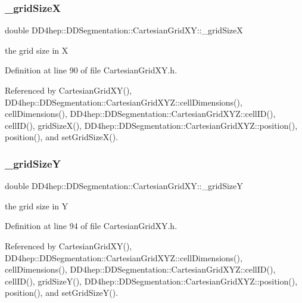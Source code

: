 \subsubsection{\texorpdfstring{\+\_\+grid\+SizeX}{\_gridSizeX}}
{\footnotesize\ttfamily double D\+D4hep\+::\+D\+D\+Segmentation\+::\+Cartesian\+Grid\+X\+Y\+::\+\_\+grid\+SizeX\hspace{0.3cm}{\ttfamily [protected]}}



the grid size in X 



Definition at line 90 of file Cartesian\+Grid\+X\+Y.\+h.



Referenced by Cartesian\+Grid\+X\+Y(), D\+D4hep\+::\+D\+D\+Segmentation\+::\+Cartesian\+Grid\+X\+Y\+Z\+::cell\+Dimensions(), cell\+Dimensions(), D\+D4hep\+::\+D\+D\+Segmentation\+::\+Cartesian\+Grid\+X\+Y\+Z\+::cell\+I\+D(), cell\+I\+D(), grid\+Size\+X(), D\+D4hep\+::\+D\+D\+Segmentation\+::\+Cartesian\+Grid\+X\+Y\+Z\+::position(), position(), and set\+Grid\+Size\+X().

\hypertarget{class_d_d4hep_1_1_d_d_segmentation_1_1_cartesian_grid_x_y_a63a6d16599e635a2046e144fb465e181}{}\label{class_d_d4hep_1_1_d_d_segmentation_1_1_cartesian_grid_x_y_a63a6d16599e635a2046e144fb465e181} 
\subsubsection{\texorpdfstring{\+\_\+grid\+SizeY}{\_gridSizeY}}
{\footnotesize\ttfamily double D\+D4hep\+::\+D\+D\+Segmentation\+::\+Cartesian\+Grid\+X\+Y\+::\+\_\+grid\+SizeY\hspace{0.3cm}{\ttfamily [protected]}}



the grid size in Y 



Definition at line 94 of file Cartesian\+Grid\+X\+Y.\+h.



Referenced by Cartesian\+Grid\+X\+Y(), D\+D4hep\+::\+D\+D\+Segmentation\+::\+Cartesian\+Grid\+X\+Y\+Z\+::cell\+Dimensions(), cell\+Dimensions(), D\+D4hep\+::\+D\+D\+Segmentation\+::\+Cartesian\+Grid\+X\+Y\+Z\+::cell\+I\+D(), cell\+I\+D(), grid\+Size\+Y(), D\+D4hep\+::\+D\+D\+Segmentation\+::\+Cartesian\+Grid\+X\+Y\+Z\+::position(), position(), and set\+Grid\+Size\+Y().

